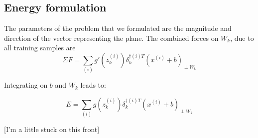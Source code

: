 \documentclass[]{article}
\begin{document}
 	\subsection{Energy formulation}
 		The parameters of the problem that we formulated are the magnitude and direction of the vector representing the plane. The combined forces on $W_k$, due to all training samples are 
 		$$\Sigma F = \sum\limits_{(i)} g'(z^{(i)}_k)  \delta^{\dagger (i) T}_k (x^{(i)}+b)_{\perp W_k}$$

		Integrating on $b$ and $W_k$ leads to:
		
		$$E = \sum\limits_{(i)} g(z^{(i)}_k)  \delta^{\dagger (i) T}_k (x^{(i)}+b)_{\perp W_k}$$
		
		[I'm a little stuck on this front]
 		
 		
 		

 		 
 
\end{document}
